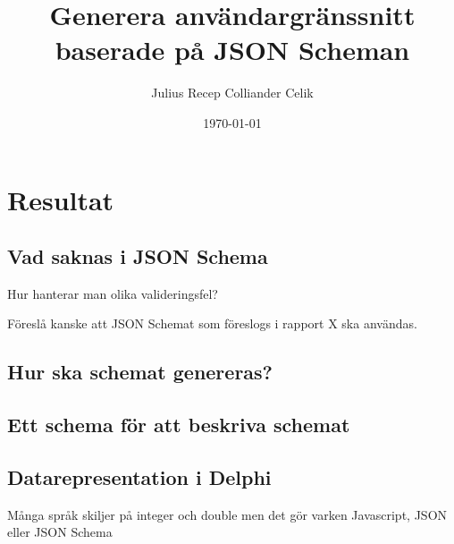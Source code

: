 \documentclass[swedish]{kththesis}
\begin{document}
\title{Generera användargränssnitt baserade på JSON Scheman}
\author{Julius Recep Colliander Celik}
\date{\today}

\frontmatter

\titlepage

%
%
%
%


\tableofcontents

\mainmatter







\chapter{Resultat}

\section{Vad saknas i JSON Schema}
Hur hanterar man olika valideringsfel?

Föreslå kanske att JSON Schemat som föreslogs i rapport X ska användas.

\section{Hur ska schemat genereras?}

\section{Ett schema för att beskriva schemat}

\section{Datarepresentation i Delphi}
Många språk skiljer på integer och double men det gör varken Javascript, JSON eller JSON Schema
\end{document}
